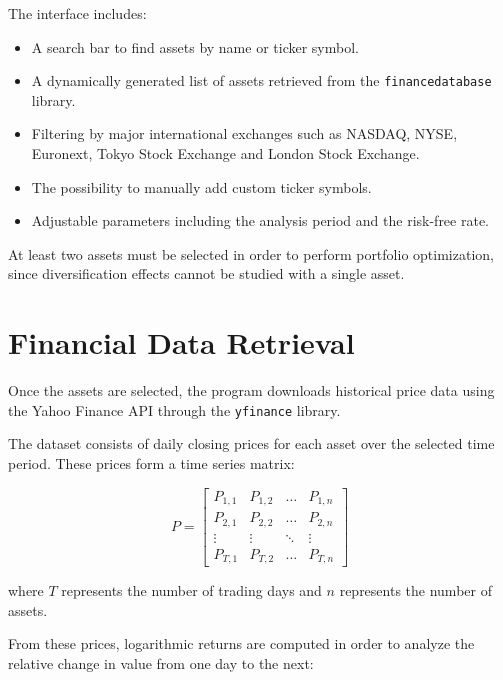 \documentclass[11pt,a4paper]{article}
\begin{document}
The interface includes:

\begin{itemize}

\item A search bar to find assets by name or ticker symbol.

\item A dynamically generated list of assets retrieved from the \texttt{financedatabase} library.

\item Filtering by major international exchanges such as NASDAQ, NYSE, Euronext, Tokyo Stock Exchange and London Stock Exchange.

\item The possibility to manually add custom ticker symbols.

\item Adjustable parameters including the analysis period and the risk-free rate.

\end{itemize}

At least two assets must be selected in order to perform portfolio optimization, since diversification effects cannot be studied with a single asset.

\section{Financial Data Retrieval}

Once the assets are selected, the program downloads historical price data using the Yahoo Finance API through the \texttt{yfinance} library.

The dataset consists of daily closing prices for each asset over the selected time period. 
These prices form a time series matrix:

\[
P =
\begin{bmatrix}
P_{1,1} & P_{1,2} & \dots & P_{1,n} \\
P_{2,1} & P_{2,2} & \dots & P_{2,n} \\
\vdots & \vdots & \ddots & \vdots \\
P_{T,1} & P_{T,2} & \dots & P_{T,n}
\end{bmatrix}
\]

where \(T\) represents the number of trading days and \(n\) represents the number of assets.

From these prices, logarithmic returns are computed in order to analyze the relative change in value from one day to the next:
\end{document}
